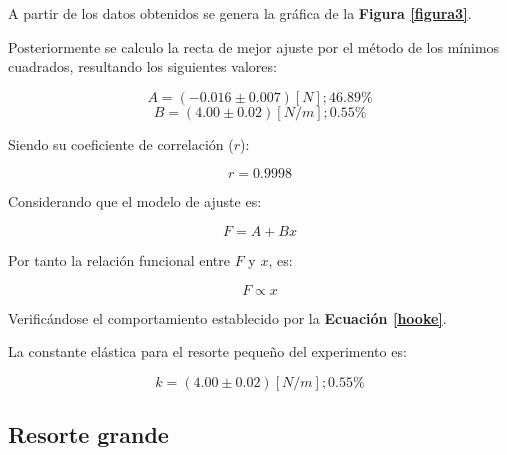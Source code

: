 \documentclass[letter,11pt]{article}
\begin{document}
A partir de los datos obtenidos se genera la gráfica de la
\textbf{Figura \ref{figura3}}.

Posteriormente se calculo la recta de mejor ajuste por el método de los mínimos
cuadrados, resultando los siguientes valores:

\begin{equation*}
    A = (-0.016 \pm 0.007) [N]; 46.89\%
\end{equation*}
\begin{equation*}
    B = (4.00 \pm 0.02) [N/m]; 0.55\%
\end{equation*}
\vspace{0.10cm}

Siendo su coeficiente de correlación ($r$):

\begin{equation*}
    r = 0.9998
\end{equation*}
\vspace{0.10cm}

Considerando que el modelo de ajuste es:

\begin{equation*}
    F = A + B x
\end{equation*}
\vspace{0.10cm}

Por tanto la relación funcional entre $F$ y $x$, es:

\begin{equation*}
    F \propto x
\end{equation*}
\vspace{0.10cm}

Verificándose el comportamiento establecido por la
\textbf{Ecuación \ref{hooke}}.

La constante elástica para el resorte pequeño del experimento es:

\begin{equation*}
    k = (4.00 \pm 0.02) [N/m]; 0.55\%
\end{equation*}
\vspace{0.10cm}

\subsection{Resorte grande}
\end{document}
